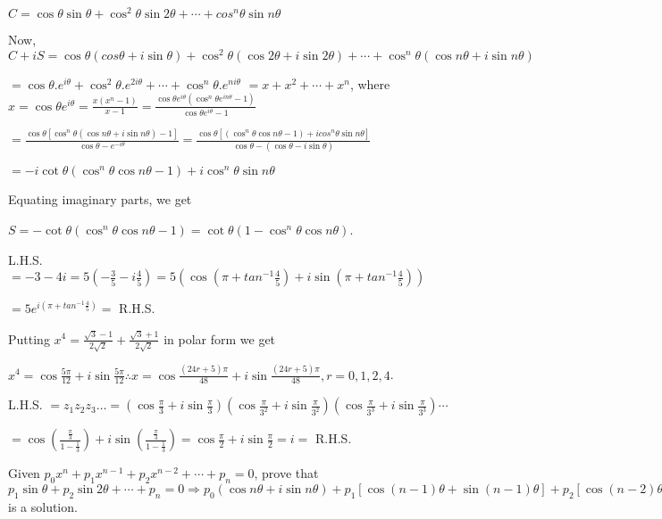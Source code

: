   $C = \cos\theta \sin\theta + \cos^2\theta \sin 2\theta + \cdots + cos^n\theta \sin n\theta$

  Now, $C + iS = \cos\theta(cos\theta + i \sin\theta) + \cos^2\theta(\cos2\theta + i \sin 2\theta) + \cdots
  + \cos^n\theta(\cos n\theta + i \sin n\theta)$

  $= \cos\theta.e^{i\theta} + \cos^2\theta.e^{2i\theta} + \cdots + \cos^n\theta.e^{ni\theta}$
  $= x + x^2 + \cdots + x^n$, where $x = \cos\theta e^{i\theta}= \frac{x(x^n - 1)}{x - 1} = \frac{\cos\theta
    e^{i\theta}(\cos^n\theta e^{in\theta} - 1)}{\cos\theta e^{i\theta} - 1}$

  $= \frac{\cos\theta[\cos^n\theta(\cos n\theta + i \sin n\theta) - 1]}{\cos\theta - e^{-i\theta}} =
  \frac{\cos\theta[(\cos^n\theta\cos n\theta -1) + i cos^n\theta\sin n\theta]}{\cos\theta - (\cos\theta
    - i\sin\theta)}$

  $= -i \cot\theta(\cos^n\theta \cos n\theta - 1) + i \cos^n\theta \sin n\theta$

  Equating imaginary parts, we get

  $S = -\cot\theta(\cos^n\theta \cos n\theta - 1) = \cot\theta(1 - \cos^n\theta\cos n\theta)$.
\item L.H.S. $= -3 -4i = 5\left(-\frac{3}{5} - i\frac{4}{5}\right) = 5\left(\cos\left(\pi +
  tan^{-1}\frac{4}{5}\right) +i \sin\left(\pi + tan^{-1}\frac{4}{5}\right)\right)$

  $= 5e^{i\left(\pi + tan^{-1}\frac{4}{5}\right)} =$ R.H.S.
\item Putting $x^4 = \frac{\sqrt{3} - 1}{2\sqrt{2}} + \frac{\sqrt{3} + 1}{2\sqrt{2}}$ in polar form we get

  $x^4 = \cos\frac{5\pi}{12} + i \sin\frac{5\pi}{12} \therefore x = \cos\frac{(24r + 5)\pi}{48} + i
  \sin\frac{(24r + 5)\pi}{48}, r = 0, 1, 2, 4$.
\item L.H.S. $= z_1z_2z_3\ldots = \left(\cos\frac{\pi}{3} +
  i\sin\frac{\pi}{3}\right)\left(\cos\frac{\pi}{3^2} + i\sin\frac{\pi}{3^2}\right)\left(\cos\frac{\pi}{3^3}
  + i\sin\frac{\pi}{3^3}\right)\cdots$

  $= \cos\left(\frac{\frac{\pi}{3}}{1 - \frac{1}{3}}\right) + i\sin\left(\frac{\frac{\pi}{3}}{1 -
    \frac{1}{3}}\right) = \cos\frac{\pi}{2} + i\sin\frac{\pi}{2} = i =$ R.H.S.
\item Given $p_0x^n + p_1x^{n - 1} + p_2x^{n - 2} + \cdots + p_n = 0$, prove that $p_1\sin\theta +
  p_2\sin2\theta + \cdots + p_n = 0 \Rightarrow p_0(\cos n\theta + i\sin n\theta) + p_1[\cos(n - 1)\theta +
    \sin(n - 1)\theta] + p_2[\cos(n - 2)\theta + i\sin(n - 2)\theta] + \cdots + p_n = 0\;[\because
    \cos\theta + i\sin\theta]$ is a solution.

